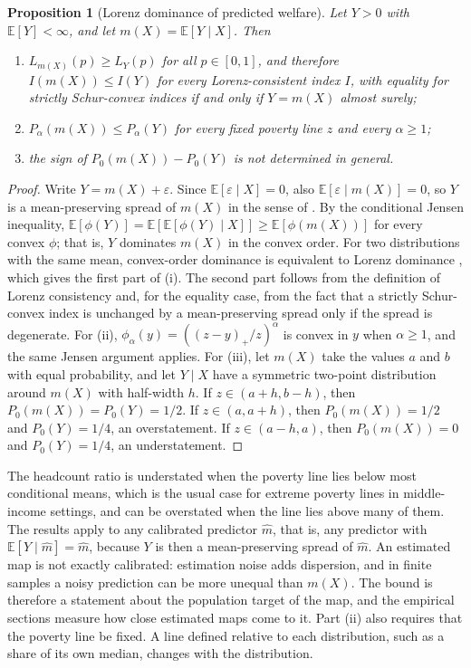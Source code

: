 \documentclass[pdflatex,sn-mathphys-ay]{sn-jnl}
\theoremstyle{thmstyleone}%
\newtheorem{proposition}{Proposition}%
\theoremstyle{thmstyletwo}%
\theoremstyle{thmstylethree}%
\newcommand{\E}{\mathbb{E}}
\begin{document}
\begin{proposition}[Lorenz dominance of predicted welfare]\label{prop:lorenz}
Let $Y>0$ with $\E[Y]<\infty$, and let $m(X)=\E[Y\mid X]$. Then
\begin{enumerate}
\item[(i)] $L_{m(X)}(p)\geq L_Y(p)$ for all $p\in[0,1]$, and therefore $I(m(X))\leq I(Y)$ for every Lorenz-consistent index $I$, with equality for strictly Schur-convex indices if and only if $Y=m(X)$ almost surely;
\item[(ii)] $P_\alpha(m(X))\leq P_\alpha(Y)$ for every fixed poverty line $z$ and every $\alpha\geq 1$;
\item[(iii)] the sign of $P_0(m(X))-P_0(Y)$ is not determined in general.
\end{enumerate}
\end{proposition}

\begin{proof}
Write $Y=m(X)+\varepsilon$. Since $\E[\varepsilon\mid X]=0$, also $\E[\varepsilon\mid m(X)]=0$, so $Y$ is a mean-preserving spread of $m(X)$ in the sense of \citet{rothschild1970}. By the conditional Jensen inequality, $\E[\phi(Y)]=\E[\E[\phi(Y)\mid X]]\geq \E[\phi(m(X))]$ for every convex $\phi$; that is, $Y$ dominates $m(X)$ in the convex order. For two distributions with the same mean, convex-order dominance is equivalent to Lorenz dominance \citep{atkinson1970}, which gives the first part of (i). The second part follows from the definition of Lorenz consistency and, for the equality case, from the fact that a strictly Schur-convex index is unchanged by a mean-preserving spread only if the spread is degenerate. For (ii), $\phi_\alpha(y)=((z-y)_+/z)^\alpha$ is convex in $y$ when $\alpha\geq 1$, and the same Jensen argument applies. For (iii), let $m(X)$ take the values $a$ and $b$ with equal probability, and let $Y\mid X$ have a symmetric two-point distribution around $m(X)$ with half-width $h$. If $z\in(a+h,b-h)$, then $P_0(m(X))=P_0(Y)=1/2$. If $z\in(a,a+h)$, then $P_0(m(X))=1/2$ and $P_0(Y)=1/4$, an overstatement. If $z\in(a-h,a)$, then $P_0(m(X))=0$ and $P_0(Y)=1/4$, an understatement.
\end{proof}

The headcount ratio is understated when the poverty line lies below most conditional means, which is the usual case for extreme poverty lines in middle-income settings, and can be overstated when the line lies above many of them. The results apply to any calibrated predictor $\hat m$, that is, any predictor with $\E[Y\mid \hat m]=\hat m$, because $Y$ is then a mean-preserving spread of $\hat m$. An estimated map is not exactly calibrated: estimation noise adds dispersion, and in finite samples a noisy prediction can be more unequal than $m(X)$. The bound is therefore a statement about the population target of the map, and the empirical sections measure how close estimated maps come to it. Part (ii) also requires that the poverty line be fixed. A line defined relative to each distribution, such as a share of its own median, changes with the distribution.
\end{document}
